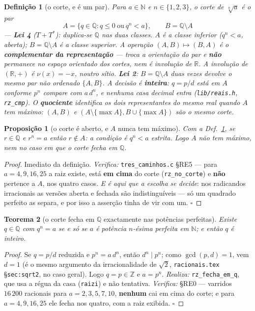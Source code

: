 \documentclass[11pt,a4paper]{article}
\newtheorem{teorema}{Teorema}
\newtheorem{proposicao}[teorema]{Proposição}
\newtheorem{definicao}{Definição}
\newcommand{\code}[1]{\texttt{\small #1}}
\newcommand{\Q}{\mathbb{Q}}
\newcommand{\R}{\mathbb{R}}
\begin{document}
\begin{definicao}[o corte, e é um par]\label{def:corte}
Para $a\in\mathbb{N}$ e $n\in\{1,2,3\}$, o corte de $\sqrt[n]{a}$ é o par
\[
\boxed{\;A=\{q\in\Q: q\le 0\ \text{ou}\ q^{n}<a\},\qquad B=\Q\setminus A\;}
\]
--- \textbf{Lei 4} ($T+T^{*}$): duplica-se $\Q$ nas duas classes. $A$ é a classe
inferior ($q^{n}<a$, aberta); $B=\Q\setminus A$ é a classe superior. A operação
$(A,B)\mapsto(B,A)$ é o \textbf{complementar da representação} --- troca a
orientação do par e \textbf{não} permanece no espaço orientado dos cortes, nem
é involução de $\R$. A involução de $(\R,+)$ é $\nu(x)=-x$, noutro sítio.
\textbf{Lei 2}: $B=\Q\setminus A$ duas vezes devolve o mesmo par não ordenado
$\{A,B\}$. A decisão é \textbf{inteira}: $q=p/d$ está em $A$ conforme
$p^{n}$ compare com $a\,d^{n}$, e nenhuma casa decimal entra
(\code{lib/reais.h}, \code{rz\_cmp}). O \textbf{quociente} identifica os dois
representantes do mesmo real quando $A$ tem máximo: $(A,B)$ e
$(A\setminus\{\max A\},B\cup\{\max A\})$ são o mesmo corte.
\end{definicao}

\begin{proposicao}[o corte é aberto, e $A$ nunca tem máximo]\label{prop:aberto}
Com a Def.~\ref{def:corte}, se $r\in\Q$ e $r^{n}=a$ então $r\notin A$: a
condição é $q^{n}<a$ \emph{estrita}. Logo $A$ não tem máximo, nem no caso em
que o corte fecha em $\Q$.
\end{proposicao}

\begin{proof}
Imediato da definição. \emph{Verifica:} \code{tres\_caminhos.c} §RE5 --- para
$a=4,9,16,25$ a raiz existe, está \textbf{em cima} do corte
(\code{rz\_no\_corte}) e \textbf{não} pertence a $A$, nos quatro casos.
\emph{E é aqui que a escolha se decide}: nos radicandos irracionais as versões
aberta e fechada são indistinguíveis --- só um quadrado perfeito as separa,
e por isso a asserção tinha de vir com um. $\square$
\end{proof}

\begin{teorema}[o corte fecha em $\Q$ exactamente nas potências perfeitas]\label{thm:fecha}
Existe $q\in\Q$ com $q^{n}=a$ se e só se $a$ é potência $n$-ésima perfeita em
$\mathbb{N}$; e então $q$ é inteiro.
\end{teorema}

\begin{proof}
Se $q=p/d$ reduzida e $p^{n}=a\,d^{n}$, então $d^{n}\mid p^{n}$; como
$\gcd(p,d)=1$, vem $d=1$ (é o mesmo argumento da irracionalidade de $\sqrt2$,
\code{racionais.tex} §\code{sec:sqrt2}, no caso geral). Logo $q=p\in\mathbb{Z}$
e $a=p^{n}$.
\emph{Realiza:} \code{rz\_fecha\_em\_q}, que usa a régua da casa (\code{raizi})
e não tentativa. \emph{Verifica:} §RE0 --- varridos $16\,200$ racionais para
$a=2,3,5,7,10$, \textbf{nenhum} cai em cima do corte; e para $a=4,9,16,25$ ele
fecha nos quatro, com a raiz exibida. $\square$
\end{proof}
\end{document}
